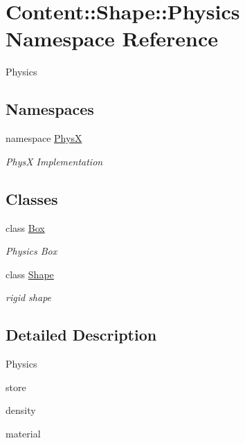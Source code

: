 \hypertarget{namespaceContent_1_1Shape_1_1Physics}{
\section{Content::Shape::Physics Namespace Reference}
\label{namespaceContent_1_1Shape_1_1Physics}
}


Physics  
\subsection*{Namespaces}
\begin{DoxyCompactItemize}
\item 
namespace \hyperlink{namespaceContent_1_1Shape_1_1Physics_1_1PhysX}{PhysX}


\begin{DoxyCompactList}\small\item\em PhysX Implementation \item\end{DoxyCompactList}\end{DoxyCompactItemize}
\subsection*{Classes}
\begin{DoxyCompactItemize}
\item 
class \hyperlink{classContent_1_1Shape_1_1Physics_1_1Box}{Box}
\begin{DoxyCompactList}\small\item\em Physics Box \item\end{DoxyCompactList}\item 
class \hyperlink{classContent_1_1Shape_1_1Physics_1_1Shape}{Shape}
\begin{DoxyCompactList}\small\item\em rigid shape \item\end{DoxyCompactList}\end{DoxyCompactItemize}


\subsection{Detailed Description}
Physics 
\begin{DoxyItemize}
\item store
\begin{DoxyItemize}
\item density
\item material 
\end{DoxyItemize}
\end{DoxyItemize}